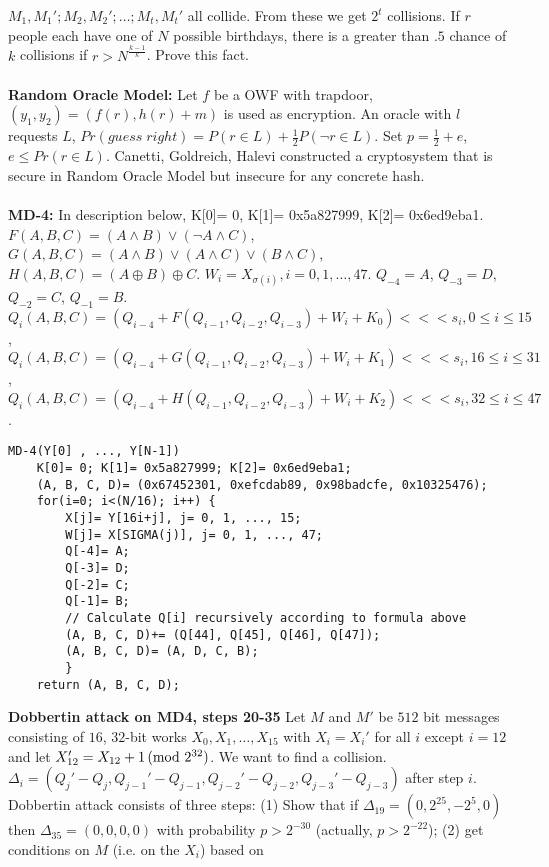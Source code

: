 $M_1,M_1'; M_2,M_2'; \ldots ; M_t,M_t'$ all collide.  From these we get  $2^t$ collisions.  
If $r$ people each have one of $N$ possible birthdays, there is a greater than $.5$ chance
of $k$ collisions if
$r > N^{\frac {k-1} k}$.  Prove this fact.
\\
\\
{\bf Random Oracle Model:} 
Let $f$ be a OWF with trapdoor, $(y_1, y_2)= (f(r) , h(r) + m)$ is used as encryption.
An oracle with $l$ requests $L$, $Pr(guess \; right)= P( r \in L) + {\frac 1 2} P( \neg r \in L)$.  
Set $p= {\frac 1 2}+e$,
$e \le Pr(r \in L)$.  
Canetti, Goldreich, Halevi constructed a cryptosystem that is secure in Random Oracle Model but 
insecure for any concrete hash.
\\
\\
{\bf MD-4:}  In description below, K[0]= 0, K[1]= 0x5a827999, K[2]= 0x6ed9eba1.
$F(A,B,C) = (A \wedge B) \vee (\neg A \wedge C)$,
$G(A,B,C) = (A \wedge B) \vee (A \wedge C) \vee (B \wedge C)$,
$H(A,B,C) = (A \oplus B) \oplus C$.  $W_i= X_{\sigma(i)}, i= 0, 1, \ldots, 47$.
$Q_{-4}= A$,
$Q_{-3}= D$,
$Q_{-2}= C$,
$Q_{-1}= B$.
$Q_i(A,B,C)= (Q_{i-4} + F(Q_{i-1}, Q_{i-2}, Q_{i-3}) + W_i + K_0)<<<s_i, 0 \le i \le 15$,
$Q_i(A,B,C)= (Q_{i-4} + G(Q_{i-1}, Q_{i-2}, Q_{i-3}) + W_i + K_1)<<<s_i, 16 \le i \le 31$,
$Q_i(A,B,C)= (Q_{i-4} + H(Q_{i-1}, Q_{i-2}, Q_{i-3}) + W_i + K_2)<<<s_i, 32 \le i \le 47$.
\begin{verbatim}
MD-4(Y[0] , ..., Y[N-1])
    K[0]= 0; K[1]= 0x5a827999; K[2]= 0x6ed9eba1; 
    (A, B, C, D)= (0x67452301, 0xefcdab89, 0x98badcfe, 0x10325476);
    for(i=0; i<(N/16); i++) {
        X[j]= Y[16i+j], j= 0, 1, ..., 15;
        W[j]= X[SIGMA(j)], j= 0, 1, ..., 47;
        Q[-4]= A;
        Q[-3]= D;
        Q[-2]= C;
        Q[-1]= B;
        // Calculate Q[i] recursively according to formula above
        (A, B, C, D)+= (Q[44], Q[45], Q[46], Q[47]);
        (A, B, C, D)= (A, D, C, B);
        }
    return (A, B, C, D);
\end{verbatim}
{\bf Dobbertin attack on MD4, steps 20-35}  
Let $M$ and $M'$ be $512$ bit messages consisting
of $16$, $32$-bit works $X_0 , X_1 , \ldots, X_{15}$ with $X_i=X_i'$ for all $i$ except
$i=12$ and let $X_{12}' = X_{12}+1 \thinspace \textnormal{(mod } 2^{32} \textnormal{)}$.  We want to find a collision.
$\Delta_i= (Q_j'- Q_j, Q_{j-1}'-Q_{j-1}, Q_{j-2}'-Q_{j-2}, Q_{j-3}' - Q_{j-3})$ after
step $i$.  Dobbertin attack consists of three steps: (1) Show that if
$\Delta_{19}= (0, 2^{25}, -2^5,0)$ then $\Delta_{35}= (0, 0, 0, 0)$ with probability
$p> 2^{-30}$ (actually,
$p> 2^{-22}$); (2) get conditions on $M$ (i.e. on the $X_i$) based on
